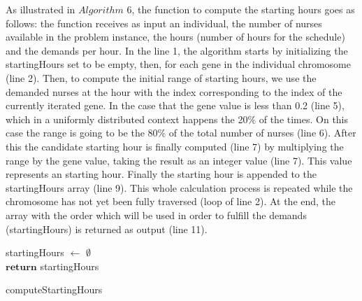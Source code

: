 As illustrated in $Algorithm$ $6$, the function to compute the starting hours goes as follows: the function receives as input an individual, the number of nurses available in the problem instance, the hours (number of hours for the schedule) and the demands per hour. In the line 1, the algorithm starts by initializing the startingHours set to be empty, then, for each gene in the individual chromosome (line 2). Then, to compute the initial range of starting hours, we use the demanded nurses at the hour with the index corresponding to the index of the currently iterated gene. In the case that the gene value is less than 0.2 (line 5), which in a uniformly distributed context happens the 20\% of the times. On this case the range is going to be the 80\% of the total number of nurses (line 6). After this the candidate starting hour is finally computed (line 7) by multiplying the range by the gene value, taking the result as an integer value (line 7). This value represents an starting hour. Finally the starting hour is appended to the startingHours array (line 9). This whole calculation process is repeated while the chromosome has not yet been fully traversed (loop of line 2). At the end, the array with the order which will be used in order to fulfill the demands (startingHours) is returned as output (line 11).

\begin{algorithm}[H]

startingHours $\leftarrow$ $\emptyset$ \\
$\textbf{return}$ startingHours
\caption{computeStartingHours}\label{alg.mainLoop}
\end{algorithm}


